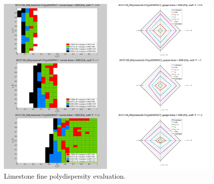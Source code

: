 \begin{figure}[!htb]
\centering
\includegraphics[width=.96\columnwidth]{images/084limestone0315}
\caption[Limestone fine polydispersity evaluation]{Limestone fine polydispersity evaluation.}
\label{fig:084limestone0315}
\end{figure}